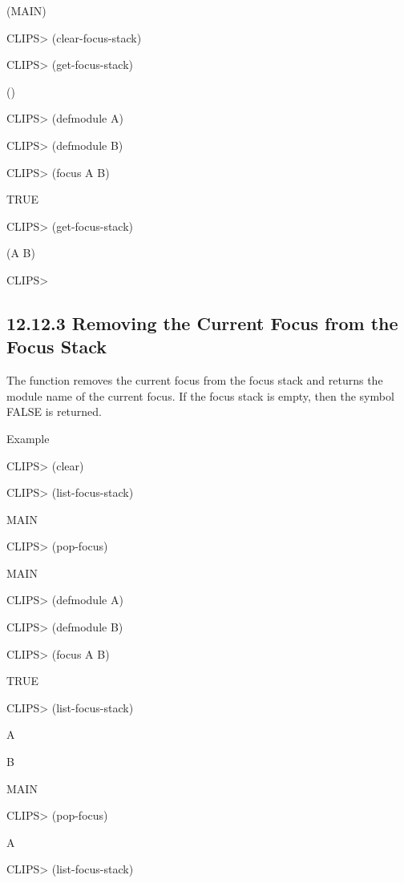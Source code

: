 \documentclass[letterpaper,10pt,english]{sphinxmanual}
\begin{document}
(MAIN)

CLIPS\textgreater{} (clear-focus-stack)

CLIPS\textgreater{} (get-focus-stack)

()

CLIPS\textgreater{} (defmodule A)

CLIPS\textgreater{} (defmodule B)

CLIPS\textgreater{} (focus A B)

TRUE

CLIPS\textgreater{} (get-focus-stack)

(A B)

CLIPS\textgreater{}


\subsection{12.12.3 Removing the Current Focus from the Focus Stack}
\label{\detokenize{actions:removing-the-current-focus-from-the-focus-stack}}
The function  removes the current focus from the focus
stack and returns the module name of the current focus. If the focus
stack is empty, then the symbol FALSE is returned.


\begin{sphinxVerbatim}[commandchars=\\\{\}]
\end{sphinxVerbatim}

Example

CLIPS\textgreater{} (clear)

CLIPS\textgreater{} (list-focus-stack)

MAIN

CLIPS\textgreater{} (pop-focus)

MAIN

CLIPS\textgreater{} (defmodule A)

CLIPS\textgreater{} (defmodule B)

CLIPS\textgreater{} (focus A B)

TRUE

CLIPS\textgreater{} (list-focus-stack)

A

B

MAIN

CLIPS\textgreater{} (pop-focus)

A

CLIPS\textgreater{} (list-focus-stack)
\end{document}
